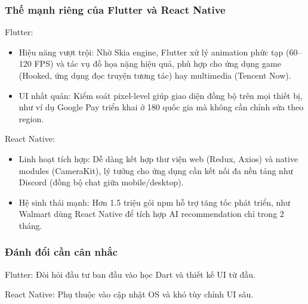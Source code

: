     \subsubsection{Thế mạnh riêng của Flutter và React Native}
    \begin{flushleft}
      \hspace*{0.8cm}Flutter:
      \setlength{\leftmargini}{1.5cm}
      \begin{itemize}
        \item Hiệu năng vượt trội: Nhờ Skia engine, Flutter xử lý animation phức tạp (60–120 FPS) và tác vụ đồ họa nặng hiệu quả, phù hợp cho ứng dụng game (Hooked, ứng dụng đọc truyện tương tác) hay multimedia (Tencent Now).
        \item	UI nhất quán: Kiểm soát pixel-level giúp giao diện đồng bộ trên mọi thiết bị, như ví dụ Google Pay triển khai ở 180 quốc gia mà không cần chỉnh sửa theo region.
      \end{itemize}
    \end{flushleft}

    \begin{flushleft}
      \hspace*{0.8cm}React Native:
      \setlength{\leftmargini}{1.5cm}
      \begin{itemize}
          \item Linh hoạt tích hợp: Dễ dàng kết hợp thư viện web (Redux, Axios) và native modules (CameraKit), lý tưởng cho ứng dụng cần kết nối đa nền tảng như Discord (đồng bộ chat giữa mobile/desktop).
          \item Hệ sinh thái mạnh: Hơn 1.5 triệu gói npm hỗ trợ tăng tốc phát triển, như Walmart dùng React Native để tích hợp AI recommendation chỉ trong 2 tháng.
      \end{itemize}
    \end{flushleft}

    \subsubsection{Đánh đổi cần cân nhắc}
    \begin{flushleft}
      \hspace*{0.8cm}Flutter: Đòi hỏi đầu tư ban đầu vào học Dart và thiết kế UI từ đầu.
    \end{flushleft}

    \begin{flushleft}
      \hspace*{0.8cm}React Native: Phụ thuộc vào cập nhật OS và khó tùy chỉnh UI sâu.
    \end{flushleft}

